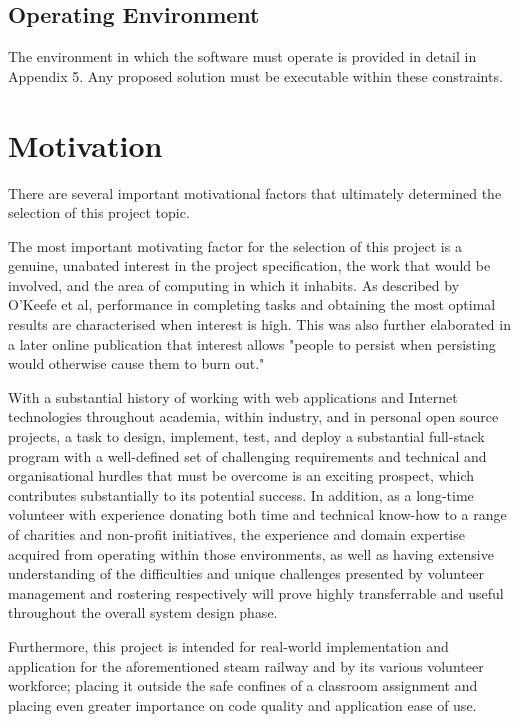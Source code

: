 \subsection{Operating Environment}
The environment in which the software must operate is provided in detail in Appendix 5. Any proposed solution must be executable within these constraints.

\section{Motivation}
There are several important motivational factors that ultimately determined the selection of this project topic.

The most important motivating factor for the selection of this project is a genuine, unabated interest in the project specification, the work that would be involved, and the area of computing in which it inhabits. As described by O'Keefe et al, performance in completing tasks and obtaining the most optimal results are characterised when interest is high. \cite{OKEEFE201470} This was also further elaborated in a later online publication that interest allows "people to persist when persisting would otherwise cause them to burn out." \cite{OKEEFE2014WEB}

With a substantial history of working with web applications and Internet technologies throughout academia, within industry, and in personal open source projects, a task to design, implement, test, and deploy a substantial full-stack program with a well-defined set of challenging requirements and technical and organisational hurdles that must be overcome is an exciting prospect, which contributes substantially to its potential success. In addition, as a long-time volunteer with experience donating both time and technical know-how to a range of charities and non-profit initiatives, the experience and domain expertise acquired from operating within those environments, as well as  having extensive understanding of the difficulties and unique challenges presented by volunteer management and rostering respectively will prove highly transferrable and useful throughout the overall system design phase.

Furthermore, this project is intended for real-world implementation and application for the aforementioned steam railway and by its various volunteer workforce; placing it outside the safe confines of a classroom assignment and placing even greater importance on code quality and application ease of use.
